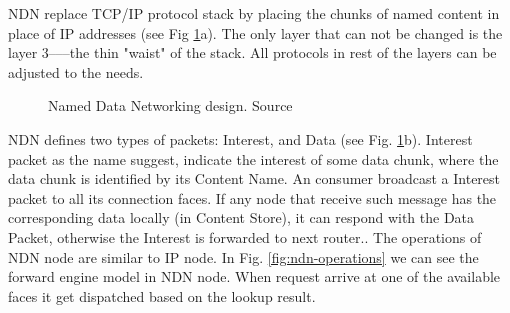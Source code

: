 NDN replace TCP/IP protocol stack by placing the chunks of named content in place of IP addresses (see Fig \ref{fig:ndn-design}a). The only layer that can not be changed is the layer 3–––the thin "waist" of the stack. All protocols in rest of the layers can be adjusted to the needs.
\begin{figure}[h!]
 \hfill 	
\caption{Named Data Networking design. Source \cite{jacobson2009networking}}
\label{fig:ndn-design}
\end{figure}
NDN defines two types of packets: Interest, and Data (see Fig. \ref{fig:ndn-design}b). Interest packet as the name suggest, indicate the interest of some data chunk, where the data chunk is identified by its Content Name. An consumer broadcast a Interest packet to all its connection faces. If any node that receive such message has the corresponding data locally (in Content Store), it can respond with the Data Packet, otherwise the Interest is forwarded to next router..
The operations of NDN node are similar to IP node. In Fig. \ref{fig:ndn-operations} we can see the forward engine model in NDN node. When request arrive at one of the available faces it get dispatched based on the lookup result. 

